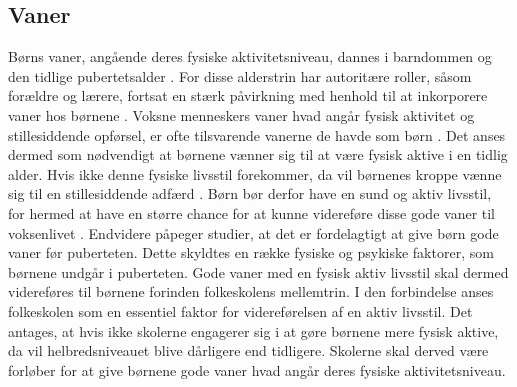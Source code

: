 \subsection{Vaner}
Børns vaner, angående deres fysiske aktivitetsniveau, dannes i barndommen og den tidlige pubertetsalder \citep{F.SallisG.Simons-MortonJ.Stone1992}. For disse alderstrin har autoritære roller, såsom forældre og lærere, fortsat en stærk påvirkning med henhold til at inkorporere vaner hos børnene \citep{L.MeyerP.Gullotta2012}. \newline
Voksne menneskers vaner hvad angår fysisk aktivitet og stillesiddende opførsel, er ofte tilsvarende vanerne de havde som børn \citep{P.J.KremersBrug2008}. Det anses dermed som nødvendigt at børnene vænner sig til at være fysisk aktive i en tidlig alder. Hvis ikke denne fysiske livsstil forekommer, da vil børnenes kroppe vænne sig til en stillesiddende adfærd \citep{Nabe-NielsenSundhedsministerietetal.2005}. \newline
Børn bør derfor have en sund og aktiv livsstil, for hermed at have en større chance for at kunne videreføre disse gode vaner til voksenlivet \citep{L.MeyerP.Gullotta2012}. Endvidere påpeger studier, at det er fordelagtigt at give børn gode vaner før puberteten. Dette skyldtes en række fysiske og psykiske faktorer, som børnene undgår i puberteten. Gode vaner med en fysisk aktiv livsstil skal dermed videreføres til børnene forinden folkeskolens mellemtrin. I den forbindelse anses folkeskolen som en essentiel faktor for videreførelsen af en aktiv livsstil. Det antages, at hvis ikke skolerne engagerer sig i at gøre børnene mere fysisk aktive, da vil helbredsniveauet blive dårligere end tidligere. Skolerne skal derved være forløber for at give børnene gode vaner hvad angår deres fysiske aktivitetsniveau. \citep{L.MeyerP.Gullotta2012}

